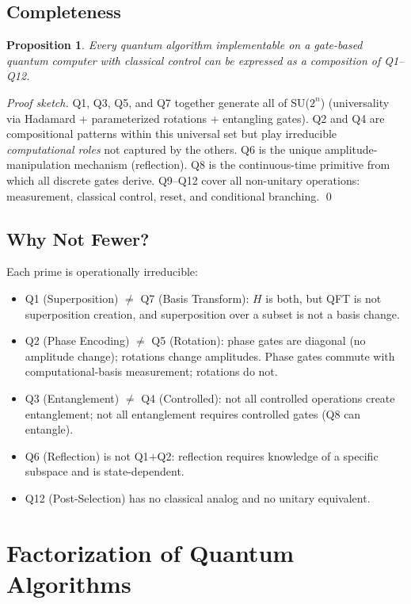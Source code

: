 \documentclass[11pt]{article}
\newtheorem{proposition}{Proposition}
\begin{document}
\subsection{Completeness}

\begin{proposition}
Every quantum algorithm implementable on a gate-based quantum computer with classical control can be expressed as a composition of Q1--Q12.
\end{proposition}

\begin{proof}[Proof sketch]
Q1, Q3, Q5, and Q7 together generate all of SU($2^n$) (universality via Hadamard + parameterized rotations + entangling gates). Q2 and Q4 are compositional patterns within this universal set but play irreducible \textit{computational roles} not captured by the others. Q6 is the unique amplitude-manipulation mechanism (reflection). Q8 is the continuous-time primitive from which all discrete gates derive. Q9--Q12 cover all non-unitary operations: measurement, classical control, reset, and conditional branching. \qed
\end{proof}

\subsection{Why Not Fewer?}

Each prime is operationally irreducible:
\begin{itemize}[leftmargin=*]
\item Q1 (Superposition) $\neq$ Q7 (Basis Transform): $H$ is both, but QFT is not superposition creation, and superposition over a subset is not a basis change.
\item Q2 (Phase Encoding) $\neq$ Q5 (Rotation): phase gates are diagonal (no amplitude change); rotations change amplitudes. Phase gates commute with computational-basis measurement; rotations do not.
\item Q3 (Entanglement) $\neq$ Q4 (Controlled): not all controlled operations create entanglement; not all entanglement requires controlled gates (Q8 can entangle).
\item Q6 (Reflection) is not Q1$+$Q2: reflection requires knowledge of a specific subspace and is state-dependent.
\item Q12 (Post-Selection) has no classical analog and no unitary equivalent.
\end{itemize}

\section{Factorization of Quantum Algorithms}
\label{sec:factorization}
\end{document}
